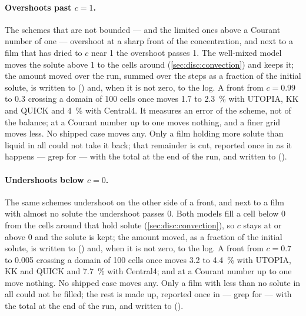 \paragraph{Overshoots past $c = 1$.} The schemes that are not bounded ---
and the limited ones above a Courant number of one --- overshoot at a sharp
front of the concentration, and next to a film that has dried to $c$ near 1
the overshoot passes 1. The well-mixed model moves the solute above 1 to the
cells around (\cref{sec:disc:convection}) and keeps it; the amount moved over
the run, summed over the steps as a fraction of the initial solute, is
written to  () and, when
it is not zero, to the log. A front from $c = 0.99$ to 0.3 crossing a domain of
100 cells once moves 1.7 to \SI{2.3}{\percent} with UTOPIA, KK and QUICK and
\SI{4}{\percent} with Central4. It measures an error of the scheme, not of the
balance;  at a Courant number up to one moves nothing, and a
finer grid moves less. No shipped case moves any. Only a film holding more
solute than liquid in all could not take it back; that remainder is cut, reported once in  as
it happens --- grep for  --- with the total at the end of
the run, and written to  ().

\paragraph{Undershoots below $c = 0$.} The same schemes undershoot on the
other side of a front, and next to a film with almost no solute the
undershoot passes 0. Both models fill a cell below 0 from the cells around
that hold solute (\cref{sec:disc:convection}), so $c$ stays at or above 0 and
the solute is kept; the amount moved, as a fraction of the initial solute, is
written to  () and, when it
is not zero, to the log. A front from $c = 0.7$ to 0.005 crossing a domain of
100 cells once moves 3.2 to \SI{4.4}{\percent} with UTOPIA, KK and QUICK and
\SI{7.7}{\percent} with Central4;  and  at a Courant
number up to one move nothing. No shipped case moves any. Only a film with
less than no solute in all could not be filled; the rest is made up, reported
once in  --- grep for  --- with the
total at the end of the run, and written to 
().

